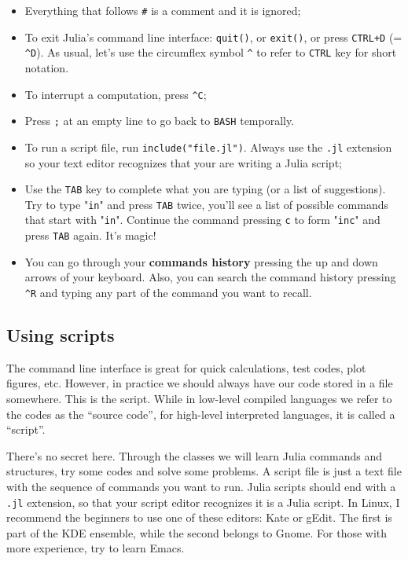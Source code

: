 \begin{itemize}
 \item Everything that follows \texttt{\#} is a comment and it is ignored;
 \item To exit Julia's command line interface: \texttt{quit()}, or \texttt{exit()}, or press \texttt{CTRL+D} (= \texttt{\textasciicircum D}). As usual, let's use the circumflex symbol \texttt{\textasciicircum} to refer to \texttt{CTRL} key for short notation.
 \item To interrupt a computation, press \texttt{\textasciicircum C};
 \item Press \texttt{;} at an empty line to go back to \texttt{BASH} temporally.
 \item To run a script file, run \texttt{include("file.jl")}. Always use the \texttt{.jl} extension so your text editor recognizes that your are writing a Julia script;
 \item Use the \texttt{TAB} key to complete what you are typing (or a list of suggestions). Try to type "\texttt{in}" and press \texttt{TAB} twice, you'll see a list of possible commands that start with "\texttt{in}". Continue the command pressing \texttt{c} to form "\texttt{inc}" and press \texttt{TAB} again. It's magic!
 \item You can go through your \textbf{commands history} pressing the up and down arrows of your keyboard. Also, you can search the command history pressing \texttt{\textasciicircum R} and typing any part of the command you want to recall.
\end{itemize}


\subsection{Using scripts}
\label{sec:scripts}

The command line interface is great for quick calculations, test codes, plot figures, etc. However, in practice we should always have our code stored in a file somewhere. This is the script. While in low-level compiled languages we refer to the codes as the ``source code'', for high-level interpreted languages, it is called a ``script''.

There's no secret here. Through the classes we will learn Julia commands and structures, try some codes and solve some problems. A script file is just a text file with the sequence of commands you want to run. Julia scripts should end with a \texttt{.jl} extension, so that your script editor recognizes it is a Julia script. In Linux, I recommend the beginners to use one of these editors: Kate or gEdit. The first is part of the KDE ensemble, while the second belongs to Gnome. For those with more experience, try to learn Emacs.

